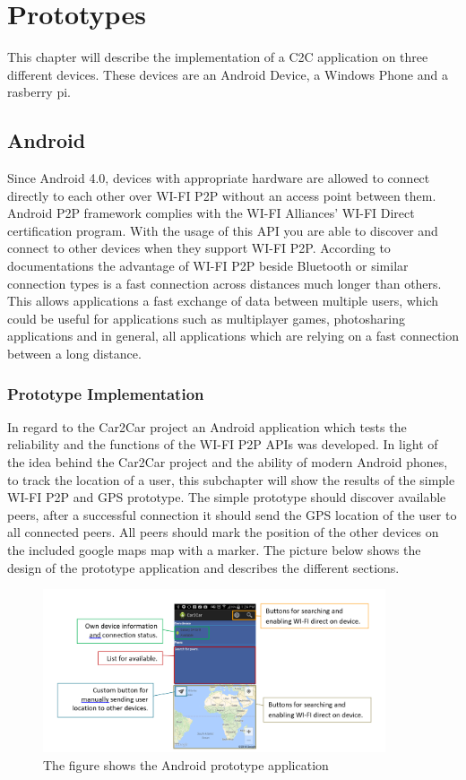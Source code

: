 \chapter{Prototypes}
\label{cha:Prototypes}
This chapter will describe the implementation of a C2C application on three different devices. These devices are an Android Device, a Windows Phone and a rasberry pi.

\section{Android}
Since Android 4.0, devices with appropriate hardware are allowed to connect directly to each other over WI-FI P2P without an access point between them. Android P2P framework complies with the WI-FI Alliances' WI-FI Direct certification program. With the usage of this API you are able to discover and connect to other devices when they support WI-FI P2P.  According to documentations the advantage of WI-FI P2P beside Bluetooth or similar connection types is a fast connection across distances much longer than others. This allows applications a fast exchange of data between multiple users, which could be useful for applications such as multiplayer games, photosharing applications and in general, all applications which are relying on a fast connection between a long distance.

\subsection*{Prototype Implementation}
\label{subsec:AndroidPrototype}
In regard to the Car2Car project an Android application which tests the reliability and the functions of the WI-FI P2P APIs was developed. In light of the idea behind the Car2Car project and the ability of modern Android phones, to track the location of a user, this subchapter will show the results of the simple WI-FI P2P and GPS prototype.
The simple prototype should discover available peers, after a successful connection it should send the GPS location of the user to all connected peers. All peers should mark the position of the other devices on the included google maps map with a marker. The picture below shows the design of the prototype application and describes the different sections.

\begin{figure}[ht]
	\centering
  \includegraphics[width=0.9\textwidth]{images/androidScreen1.png}
	\caption{The figure shows the Android prototype application}
	\label{fig1}
\end{figure}

